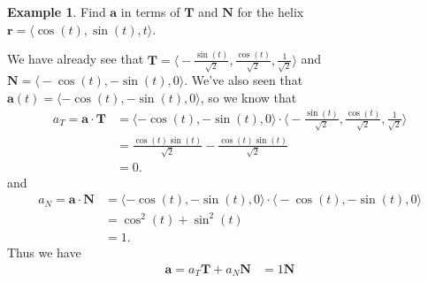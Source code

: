 \documentclass[12pt, letter]{article}
\theoremstyle{plain}
\numberwithin{theorem}{section}
\theoremstyle{definition}
\newtheorem{example}[theorem]{Example}
\begin{document}
\begin{example}
Find $\bm{a}$ in terms of $\bm{T}$ and $\bm{N}$ for the helix $\bm{r} = \langle \cos(t),\sin(t), t\rangle$.

\smallskip

We have already see that $\bm{T} = \bigg\langle -\frac{\sin(t)}{\sqrt{2}}, \frac{\cos(t)}{\sqrt{2}}, \frac{1}{\sqrt{2}} \bigg\rangle$ and $\bm{N} = \bigg\langle -\cos(t), -\sin(t), 0 \bigg\rangle$. We've also seen that $\bm{a}(t) = \langle -\cos(t), -\sin(t), 0 \rangle$, so we know that
\begin{align*}
a_T = \bm{a} \cdot \bm{T} &= \langle -\cos(t), -\sin(t), 0 \rangle \cdot \bigg\langle -\frac{\sin(t)}{\sqrt{2}}, \frac{\cos(t)}{\sqrt{2}}, \frac{1}{\sqrt{2}} \bigg\rangle\\
&= \frac{\cos(t)\sin(t)}{\sqrt{2}} -\frac{\cos(t)\sin(t)}{\sqrt{2}}\\
&= 0.
\end{align*}
and
\begin{align*}
a_N = \bm{a}\cdot\bm{N} &=  \langle -\cos(t), -\sin(t), 0 \rangle \cdot \bigg\langle -\cos(t), -\sin(t), 0 \bigg\rangle\\
&=\cos^2(t)+\sin^2(t)\\
&=1.
\end{align*}
Thus we have
\begin{align*}
\bm{a} = a_T \bm{T} + a_N \bm{N} &= 1\bm{N}\\
\end{align*}
\end{example}
\end{document}
